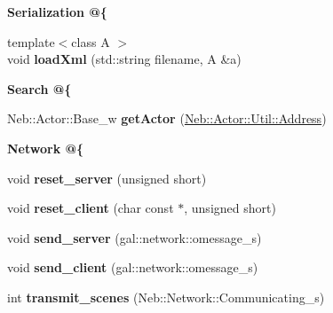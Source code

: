 \begin{Indent}{\bf \-Serialization @\{}\par
\begin{DoxyCompactItemize}
\item 
\hypertarget{classNeb_1_1App_1_1Base_aef5b0330ea53ea1ed0701cc86f0a6e02}{{\footnotesize template$<$class A $>$ }\\void {\bfseries load\-Xml} (std\-::string filename, \-A \&a)}\label{classNeb_1_1App_1_1Base_aef5b0330ea53ea1ed0701cc86f0a6e02}

\end{DoxyCompactItemize}
\end{Indent}
\begin{Indent}{\bf \-Search @\{}\par
\begin{DoxyCompactItemize}
\item 
\hypertarget{classNeb_1_1App_1_1Base_ab15cef6932ba3060d20244d65034e456}{\-Neb\-::\-Actor\-::\-Base\-\_\-w {\bfseries get\-Actor} (\hyperlink{classNeb_1_1Actor_1_1Util_1_1Address}{\-Neb\-::\-Actor\-::\-Util\-::\-Address})}\label{classNeb_1_1App_1_1Base_ab15cef6932ba3060d20244d65034e456}

\end{DoxyCompactItemize}
\end{Indent}
\begin{Indent}{\bf \-Network @\{}\par
\begin{DoxyCompactItemize}
\item 
\hypertarget{classNeb_1_1App_1_1Base_ab9d0a601ee3d27fdde0ae749688301bc}{void {\bfseries reset\-\_\-server} (unsigned short)}\label{classNeb_1_1App_1_1Base_ab9d0a601ee3d27fdde0ae749688301bc}

\item 
\hypertarget{classNeb_1_1App_1_1Base_a7dbb058185e79e6d9766c5bcba10ef94}{void {\bfseries reset\-\_\-client} (char const $\ast$, unsigned short)}\label{classNeb_1_1App_1_1Base_a7dbb058185e79e6d9766c5bcba10ef94}

\item 
\hypertarget{classNeb_1_1App_1_1Base_a63794136246ca794a014bc89f93b8da0}{void {\bfseries send\-\_\-server} (gal\-::network\-::omessage\-\_\-s)}\label{classNeb_1_1App_1_1Base_a63794136246ca794a014bc89f93b8da0}

\item 
\hypertarget{classNeb_1_1App_1_1Base_a01f7c70061935f52d5c60ec4ee568187}{void {\bfseries send\-\_\-client} (gal\-::network\-::omessage\-\_\-s)}\label{classNeb_1_1App_1_1Base_a01f7c70061935f52d5c60ec4ee568187}

\item 
\hypertarget{classNeb_1_1App_1_1Base_a9e6d3043a77d97af9f7cbe326071c49d}{int {\bfseries transmit\-\_\-scenes} (\-Neb\-::\-Network\-::\-Communicating\-\_\-s)}\label{classNeb_1_1App_1_1Base_a9e6d3043a77d97af9f7cbe326071c49d}

\end{DoxyCompactItemize}
\end{Indent}
